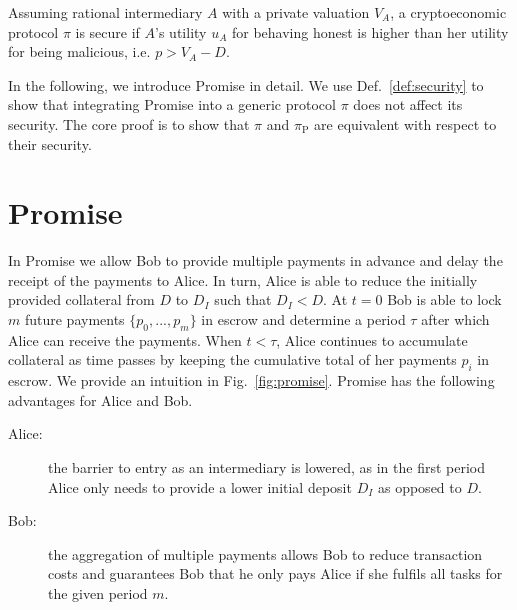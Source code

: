 \documentclass[runningheads]{llncs}
\newcommand{\sys}{Promise\xspace}
\begin{document}
\begin{definition}[Security]
    Assuming rational intermediary $A$ with a private valuation $V_A$, a cryptoeconomic protocol $\pi$ is secure if $A$'s utility $u_A$ for behaving honest is higher than her utility for being malicious, i.e. $p>V_A-D$.  
    \label{def:security}
\end{definition}

In the following, we introduce \sys in detail.
We use Def.~\ref{def:security} to show that integrating \sys into a generic protocol $\pi$ does not affect its security.
The core proof is to show that $\pi$ and $\pi_{\mathrm{P}}$ are equivalent with respect to their security.


\section{\sys}
\label{sec:promise}

In \sys we allow Bob to provide multiple payments in advance and delay the receipt of the payments to Alice.
In turn, Alice is able to reduce the initially provided collateral from $D$ to $D_I$ such that $D_I < D$.
At $t=0$ Bob is able to lock $m$ future payments $\{p_0, ..., p_m\}$ in escrow and determine a period $\tau$ after which Alice can receive the payments.
When $t < \tau$, Alice continues to accumulate collateral as time passes by keeping the cumulative total of her payments $p_i$ in escrow. 
We provide an intuition in Fig.~\ref{fig:promise}.
\sys has the following advantages for Alice and Bob. 

\begin{description}
    \item[Alice:] the barrier to entry as an intermediary is lowered, as in the first period Alice only needs to provide a lower initial deposit $D_I$ as opposed to $D$.
    \item[Bob:] the aggregation of multiple payments allows Bob to reduce transaction costs and guarantees Bob that he only pays Alice if she fulfils all tasks for the given period $m$.
\end{description}
\end{document}
